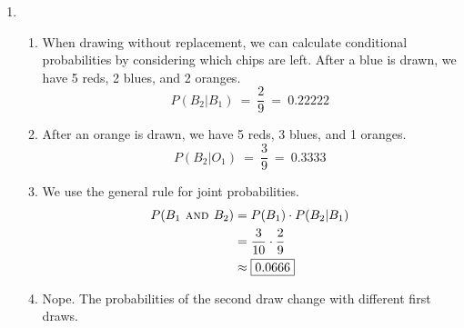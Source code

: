 \documentclass[12pt,letterpaper]{article}
\begin{document}
\begin{enumerate}
\item \begin{enumerate}
\item When drawing without replacement, we can calculate conditional probabilities by considering which chips are left. After a blue is drawn, we have 5 reds, 2 blues, and 2 oranges.
$$P(B_2 | B_1) ~=~ \frac{2}{9} ~=~ 0.22222 $$
\item After an orange is drawn, we have 5 reds, 3 blues, and 1 oranges.
$$P(B_2 | O_1) ~=~ \frac{3}{9} ~=~ 0.3333 $$
\item We use the general rule for joint probabilities.
\begin{align*}
P(B_1 \textsc{~and~} B_2) &= P(B_1)\cdot P(B_2|B_1) \\
&= \frac{3}{10} \cdot \frac{2}{9} \\
&\approx \fbox{0.0666}
\end{align*}
\item Nope. The probabilities of the second draw change with different first draws.
\end{enumerate}

\end{enumerate}
\end{document}
